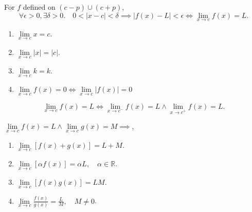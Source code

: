 \documentclass[../index]{subfiles}
\begin{document}
\begin{theorem}
    For $f$ defined on $(c-p)\cup(c+p)$,
    \[\forall\epsilon>0, \exists\delta>0. \quad 0<|x-c|<\delta \implies |f(x)-L|<\epsilon \iff \lim\limits_{x \to c} f(x)=L.\]

    \begin{enumerate}[label=\alph*.]
        \item $\lim\limits_{x \to c} x = c$.
        \item $\lim\limits_{x \to c} |x| = |c|$.
        \item $\lim\limits_{x \to c} k = k$.
        \item $\lim\limits_{x \to c} f(x)=0 \iff \lim\limits_{x \to c} |f(x)|=0$
    \end{enumerate}
\end{theorem}

\begin{theorem}
    \[\lim\limits_{x \to c} f(x)=L \iff \lim\limits_{x \to c^-} f(x) = L \land \lim\limits_{x \to c^+} f(x)=L.\]
\end{theorem}

\begin{theorem}
    $\lim\limits_{x \to c}f(x)=L \land \lim\limits_{x \to c}g(x)=M \implies$,

    \begin{enumerate}[label= (\roman*)]
        \item $\lim\limits_{x \to c} [f(x)+g(x)] = L+M$.
        \item $\lim\limits_{x \to c} [\alpha f(x)] = \alpha L, \quad \alpha\in\mathbb{R}$.
        \item $\lim\limits_{x \to c} [f(x)g(x)] = LM$.
        \item $\lim\limits_{x \to c} \frac{f(x)}{g(x)} = \frac{L}{M}, \quad M\neq0$.
    \end{enumerate}
\end{theorem}
\end{document}
